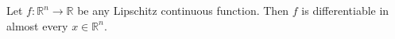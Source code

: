 \documentclass[12pt]{article}
\begin{document}
Let $f\colon \mathbb R^n\to \mathbb R$ be any Lipschitz continuous function. Then $f$ is differentiable in almost every $x\in\mathbb R^n$.
\end{document}
